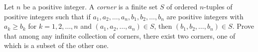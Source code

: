 Let $n$ be a positive integer. A \emph{corner} is a finite set $S$ of ordered $n$-tuples of positive integers such that if $a_1,a_2,\ldots,a_n,b_1,b_2,\ldots,b_n$ are positive integers with $a_k\geq b_k$ for $k=1,2,\ldots,n$ and $\left(a_1,a_2,\ldots,a_n\right)\in S$, then $\left(b_1,b_2,\ldots,b_n\right)\in S$. Prove that among any infinite collection of corners, there exist two corners, one of which is a subset of the other one.